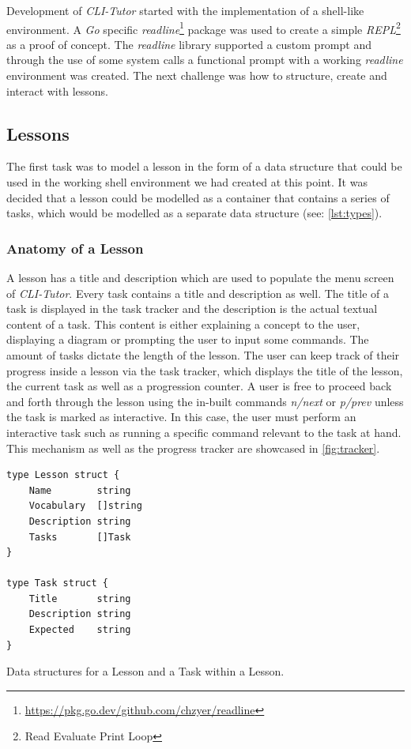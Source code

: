 Development of \textit{CLI-Tutor} started with the implementation of a
shell-like environment. A  \textit{Go} specific
\textit{readline}\footnote{\url{https://pkg.go.dev/github.com/chzyer/readline}}
package was used to create a simple \textit{REPL}\footnote{Read Evaluate Print
Loop} as a proof of concept. The \textit{readline} library supported a custom
prompt and through the use of some system calls a functional prompt with a
working \textit{readline} environment was created. The next challenge was how
to structure, create and interact with lessons.

\subsection{Lessons}

The first task was to model a lesson in the form of a data structure that could
be used in the working shell environment we had created at this point. It was
decided that a lesson could be modelled as a container that contains a series of
tasks, which would be modelled as a separate data structure (see: \autoref{lst:types}).

\subsubsection{Anatomy of a Lesson}

A lesson has a title and description which are used to populate the menu screen
of \textit{CLI-Tutor}. Every task contains a title and description as well. The
title of a task is displayed in the task tracker and the description is the
actual textual content of a task. This content is either explaining a concept
to the user, displaying a diagram or prompting the user to input some commands.
The amount of tasks dictate the length of the lesson. The user can keep track
of their progress inside a lesson via the task tracker, which displays the title
of the lesson, the current task as well as a progression counter. A user is free to
proceed back and forth through the lesson using the in-built commands
\textit{n/next} or \textit{p/prev} unless the task is marked as interactive. In
this case, the user must perform an interactive task such as running a specific
command relevant to the task at hand. This mechanism as well as the progress
tracker are showcased in \autoref{fig:tracker}.

\begin{listing}
    \begin{verbatim}
type Lesson struct {
    Name        string
    Vocabulary  []string
    Description string
    Tasks       []Task
}

type Task struct {
    Title       string
    Description string
    Expected    string
}
    \end{verbatim}
    \caption{Data structures for a Lesson and a Task within a Lesson.}
    \label{lst:types}
\end{listing}

